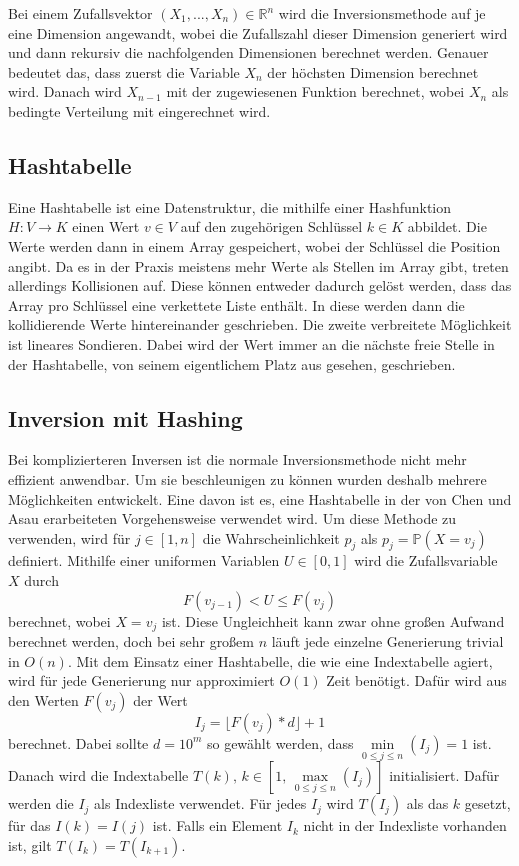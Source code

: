 Bei einem Zufallsvektor $ (X_1, ..., X_n) \in \mathbb{R}^n$ wird die 
Inversionsmethode auf je eine Dimension angewandt, wobei die Zufallszahl dieser 
Dimension generiert wird und dann rekursiv die nachfolgenden Dimensionen 
berechnet werden. Genauer bedeutet das, dass zuerst die Variable $X_n$ der 
höchsten Dimension berechnet wird. Danach wird $X_{n-1}$ mit der zugewiesenen 
Funktion berechnet, wobei $X_n$ als bedingte Verteilung mit eingerechnet wird.


\subsection{Hashtabelle}
Eine Hashtabelle ist eine Datenstruktur, die mithilfe einer Hashfunktion 
$H: V \rightarrow K$ einen Wert $v \in V$ auf den zugehörigen Schlüssel $k \in K$ 
abbildet. Die Werte werden dann in einem Array gespeichert, wobei der Schlüssel 
die Position angibt. Da es in der Praxis meistens mehr Werte als Stellen im Array 
gibt, treten allerdings Kollisionen auf. Diese können entweder dadurch gelöst 
werden, dass das Array pro Schlüssel eine verkettete Liste enthält. In diese 
werden dann die kollidierende Werte hintereinander geschrieben. Die zweite 
verbreitete Möglichkeit ist lineares Sondieren. Dabei wird der Wert immer an die 
nächste freie Stelle in der Hashtabelle, von seinem eigentlichem Platz aus 
gesehen, geschrieben.


\subsection{Inversion mit Hashing}
Bei komplizierteren Inversen ist die normale Inversionsmethode nicht 
mehr effizient anwendbar. Um sie beschleunigen zu können wurden deshalb mehrere 
Möglichkeiten entwickelt. Eine davon ist es, eine Hashtabelle in der von Chen und 
Asau \cite{chen_asau-generating_random_variates-1974} erarbeiteten Vorgehensweise 
verwendet wird. Um diese Methode zu verwenden, wird für $j \in [1, n]$ die 
Wahrscheinlichkeit $p_j$ als $p_j = \mathbb{P}(X=v_j)$ definiert. Mithilfe einer uniformen 
Variablen $U \in [0, 1]$ wird die Zufallsvariable $X$ durch 
\begin{equation}
    F(v_{j-1}) < U \leq F(v_j)
    \label{eq:hash_ineq}
\end{equation}
berechnet, wobei $X = v_j$ ist. Diese Ungleichheit kann zwar ohne großen Aufwand 
berechnet werden, doch bei sehr großem $n$ läuft jede einzelne Generierung trivial 
in $O(n)$. Mit dem Einsatz einer Hashtabelle, die wie eine Indextabelle agiert, 
wird für jede Generierung nur approximiert $O(1)$ Zeit benötigt. Dafür wird aus 
den Werten $F(v_j)$ der Wert
\begin{equation}
     I_j = \lfloor F(v_j) * d \rfloor + 1
     \label{eq:hash_I}
\end{equation}
berechnet. Dabei sollte $d = 10^m$ so gewählt werden, dass $\min\limits_{0\le 
j\le n}(I_j) = 1$ ist. Danach wird die Indextabelle $T(k),\, k \in [1,\, \max
\limits_{0\le j\le n}(I_j)]$ initialisiert. Dafür werden die $I_j$ als Indexliste 
verwendet. Für jedes $I_j$ wird $T(I_j)$ als das $k$ gesetzt, für das $I(k) = 
I(j)$ ist. Falls ein Element $I_k$ nicht in der Indexliste vorhanden ist, gilt 
$T(I_k) = T(I_{k+1})$. 

